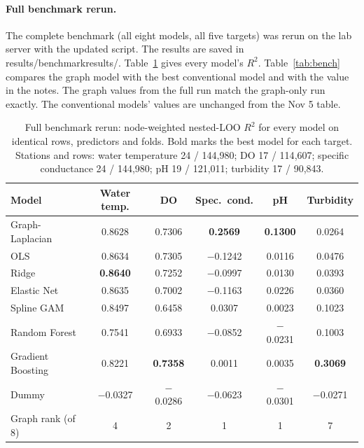 \documentclass[11pt]{article}
\newcommand{\codeus}{\textunderscore\allowbreak}
\newcommand{\code}[1]{{\ttfamily\let\_\codeus #1}}
\begin{document}
\paragraph{Full benchmark rerun.} The complete benchmark (all eight models, all five targets) was
rerun on the lab server with the updated script. The results are saved in
\code{results/benchmark\_results/}. Table~\ref{tab:benchfull} gives every model's $R^2$.
Table~\ref{tab:bench} compares the graph model with the best conventional model and with the value in
the notes. The graph values from the full run match the graph-only run exactly. The conventional
models' values are unchanged from the Nov 5 table.

\begin{table}[h]
\centering
\small
\caption{Full benchmark rerun: node-weighted nested-LOO $R^2$ for every model on identical rows,
predictors and folds. Bold marks the best model for each target. Stations and rows: water temperature
24 / 144{,}980; DO 17 / 114{,}607; specific conductance 24 / 144{,}980; pH 19 / 121{,}011;
turbidity 17 / 90{,}843.}
\label{tab:benchfull}
\begin{tabular}{l c c c c c}
\toprule
Model & {Water temp.} & {DO} & {Spec.\ cond.} & {pH} & {Turbidity} \\
\midrule
Graph-Laplacian    & 0.8628 & 0.7306 & \textbf{0.2569} & \textbf{0.1300} & 0.0264 \\
OLS                & 0.8634 & 0.7305 & $-$0.1242 & 0.0116 & 0.0476 \\
Ridge              & \textbf{0.8640} & 0.7252 & $-$0.0997 & 0.0130 & 0.0393 \\
Elastic Net        & 0.8635 & 0.7002 & $-$0.1163 & 0.0226 & 0.0360 \\
Spline GAM         & 0.8497 & 0.6458 & 0.0307 & 0.0023 & 0.1023 \\
Random Forest      & 0.7541 & 0.6933 & $-$0.0852 & $-$0.0231 & 0.1003 \\
Gradient Boosting  & 0.8221 & \textbf{0.7358} & 0.0011 & 0.0035 & \textbf{0.3069} \\
Dummy              & $-$0.0327 & $-$0.0286 & $-$0.0623 & $-$0.0301 & $-$0.0271 \\
\midrule
Graph rank (of 8)  & 4 & 2 & 1 & 1 & 7 \\
\bottomrule
\end{tabular}
\end{table}
\end{document}
